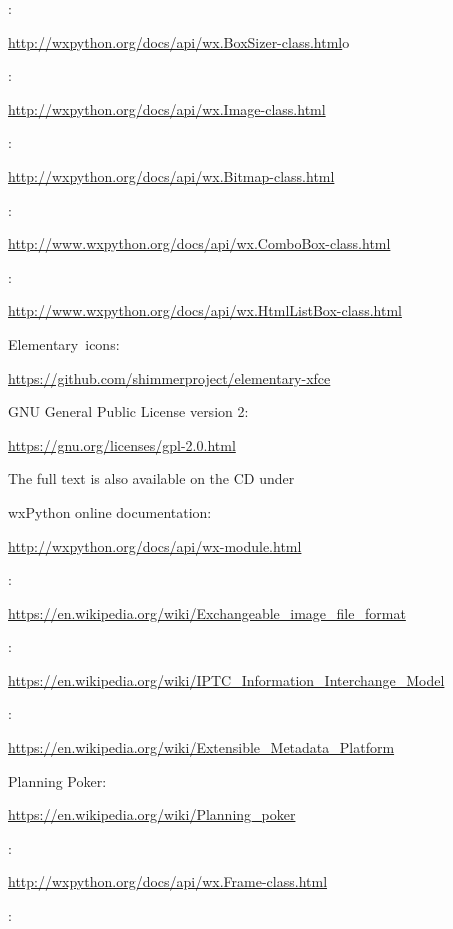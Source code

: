 \documentclass[12pt,a4paper,naustrian,english,oneside,openright,DIV=12,BCOR=1cm]{scrbook}
\begin{document}
\begin{thebibliography}{999}
	 :

	\url{http://wxpython.org/docs/api/wx.BoxSizer-class.html}o

	 :

	\url{http://wxpython.org/docs/api/wx.Image-class.html}

	 :

	\url{http://wxpython.org/docs/api/wx.Bitmap-class.html}
	
	 :
	
	\url{http://www.wxpython.org/docs/api/wx.ComboBox-class.html}
	
	 :
	
	\url{http://www.wxpython.org/docs/api/wx.HtmlListBox-class.html}

	 Elementary~icons:

	\url{https://github.com/shimmerproject/elementary-xfce}

	 GNU General Public License version 2:
	
	\url{https://gnu.org/licenses/gpl-2.0.html}
	
	
	The full text is also available on the CD under 
	
	 wxPython online documentation:
	
	\url{http://wxpython.org/docs/api/wx-module.html}
	
	 :
	
	\url{https://en.wikipedia.org/wiki/Exchangeable_image_file_format}
	
	 :
	
	\url{https://en.wikipedia.org/wiki/IPTC_Information_Interchange_Model}
	
	 :
	
	\url{https://en.wikipedia.org/wiki/Extensible_Metadata_Platform}
	
	 Planning Poker:
	
	\url{https://en.wikipedia.org/wiki/Planning_poker}
	
	 :
	
	\url{http://wxpython.org/docs/api/wx.Frame-class.html}
	
	 :
	

\end{thebibliography}
\end{document}
